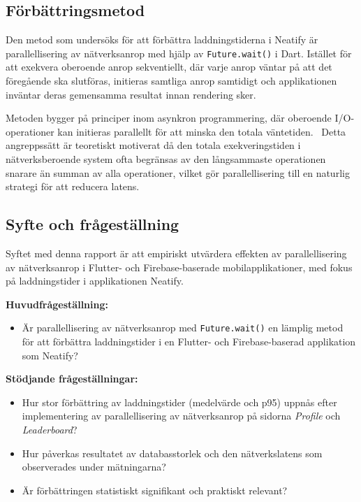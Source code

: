 \documentclass[letterpaper,twocolumn,10pt]{article}
\begin{document}
\subsection{Förbättringsmetod}

Den metod som undersöks för att förbättra laddningstiderna i Neatify är
parallellisering av nätverksanrop med hjälp av \texttt{Future.wait()} i Dart.
Istället för att exekvera oberoende anrop sekventiellt, där varje anrop väntar
på att det föregående ska slutföras, initieras samtliga anrop samtidigt och
applikationen inväntar deras gemensamma resultat innan rendering sker.~\cite{dart_future_wait}

Metoden bygger på principer inom asynkron programmering, där oberoende
I/O-operationer kan initieras parallellt för att minska den totala väntetiden.~\cite{dart_async} Detta angreppssätt är teoretiskt motiverat då den totala
exekveringstiden i nätverksberoende system ofta begränsas av den långsammaste
operationen snarare än summan av alla operationer, vilket gör parallellisering
till en naturlig strategi för att reducera latens. 

\subsection{Syfte och frågeställning}

Syftet med denna rapport är att empiriskt utvärdera effekten av parallellisering av nätverksanrop i Flutter- och Firebase-baserade mobilapplikationer, med fokus på laddningstider i applikationen Neatify.

\textbf{Huvudfrågeställning:}
\begin{itemize}
    \item Är parallellisering av nätverksanrop med \texttt{Future.wait()} en lämplig metod för att förbättra laddningstider i en Flutter- och Firebase-baserad applikation som Neatify?
\end{itemize}

\textbf{Stödjande frågeställningar:}
\begin{itemize}
    \item Hur stor förbättring av laddningstider (medelvärde och p95) uppnås efter implementering av parallellisering av nätverksanrop på sidorna \textit{Profile} och \textit{Leaderboard}?
    \item Hur påverkas resultatet av databasstorlek och den nätverkslatens som observerades under mätningarna?
    \item Är förbättringen statistiskt signifikant och praktiskt relevant?
\end{itemize}
\end{document}
